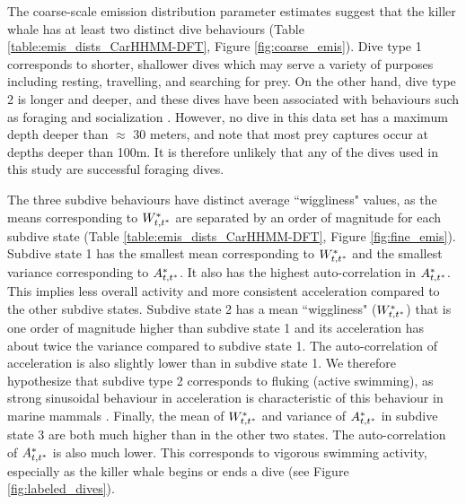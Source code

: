 The coarse-scale emission distribution parameter estimates suggest that the killer whale has at least two distinct dive behaviours (Table \ref{table:emis_dists_CarHHMM-DFT}, Figure \ref{fig:coarse_emis}). 
Dive type 1 corresponds to shorter, shallower dives which may serve a variety of purposes including resting, travelling, and searching for prey.
On the other hand, dive type 2 is longer and deeper, and these dives have been associated with behaviours such as foraging and socialization \citep{Tennessen:2019b}. However, no dive in this data set has a maximum depth deeper than $\approx$ 30 meters, and \citet{Wright:2017} note that most prey captures occur at depths deeper than 100m. It is therefore unlikely that any of the dives used in this study are successful foraging dives.

The three subdive behaviours have distinct average ``wiggliness" values, as the means corresponding to $W^*_{t,t^*}$ are separated by an order of magnitude for each subdive state (Table \ref{table:emis_dists_CarHHMM-DFT}, Figure \ref{fig:fine_emis}). 
Subdive state 1 has the smallest mean corresponding to $W^*_{t,t^*}$ and the smallest variance corresponding to $A^*_{t,t^*}$. It also has the highest auto-correlation in $A^*_{t,t^*}$. This implies less overall activity and more consistent acceleration compared to the other subdive states. 
Subdive state 2 has a mean ``wiggliness" ($W^*_{t,t^*}$) that is one order of magnitude higher than subdive state 1 and its acceleration has about twice the variance compared to subdive state 1. The auto-correlation of acceleration is also slightly lower than in subdive state 1. We therefore hypothesize that subdive type 2 corresponds to fluking (active swimming), as strong sinusoidal behaviour in acceleration is characteristic of this behaviour in marine mammals \citep{Simon:2012}.
Finally, the mean of $W^*_{t,t^*}$ and variance of $A^*_{t,t^*}$ in subdive state 3 are both much higher than in the other two states. The auto-correlation of $A^*_{t,t^*}$ is also much lower. This corresponds to vigorous swimming activity, especially as the killer whale begins or ends a dive (see Figure \ref{fig:labeled_dives}). 

